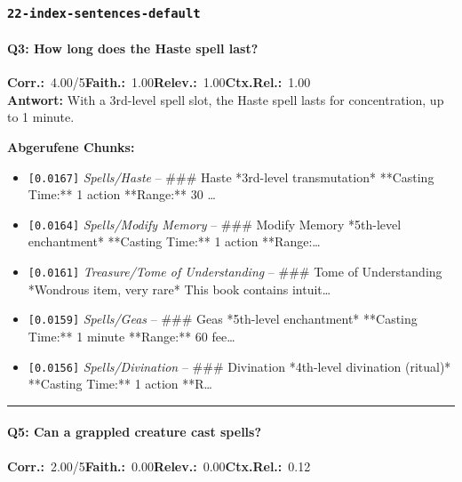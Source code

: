 \subsubsection*{\texttt{22-index-sentences-default}}
\label{app:samples:22_index_sentences_default}

\paragraph{Q3: How long does the Haste spell last?}
\noindent \textbf{Corr.:}~4.00/5\quad \textbf{Faith.:}~1.00\quad \textbf{Relev.:}~1.00\quad \textbf{Ctx.Rel.:}~1.00\\

\noindent\textbf{Antwort:} With a 3rd-level spell slot, the Haste spell lasts for concentration, up to 1 minute.

\noindent\textbf{Abgerufene Chunks:}
\begin{itemize}[noitemsep, topsep=2pt]
  \item[\textbf{\#1}] \texttt{[0.0167]} \textit{Spells/Haste} -- \#\#\# Haste  *3rd-level transmutation*  **Casting Time:** 1 action  **Range:** 30 \ldots
  \item[\textbf{\#2}] \texttt{[0.0164]} \textit{Spells/Modify Memory} -- \#\#\# Modify Memory  *5th-level enchantment*  **Casting Time:** 1 action  **Range:\ldots
  \item[\textbf{\#3}] \texttt{[0.0161]} \textit{Treasure/Tome of Understanding} -- \#\#\# Tome of Understanding  *Wondrous item, very rare*  This book contains intuit\ldots
  \item[\textbf{\#4}] \texttt{[0.0159]} \textit{Spells/Geas} -- \#\#\# Geas  *5th-level enchantment*  **Casting Time:** 1 minute  **Range:** 60 fee\ldots
  \item[\textbf{\#5}] \texttt{[0.0156]} \textit{Spells/Divination} -- \#\#\# Divination  *4th-level divination (ritual)*  **Casting Time:** 1 action  **R\ldots
\end{itemize}
\vspace{4pt}
\hrule
\vspace{6pt}

\paragraph{Q5: Can a grappled creature cast spells?}
\noindent \textbf{Corr.:}~2.00/5\quad \textbf{Faith.:}~0.00\quad \textbf{Relev.:}~0.00\quad \textbf{Ctx.Rel.:}~0.12\\

